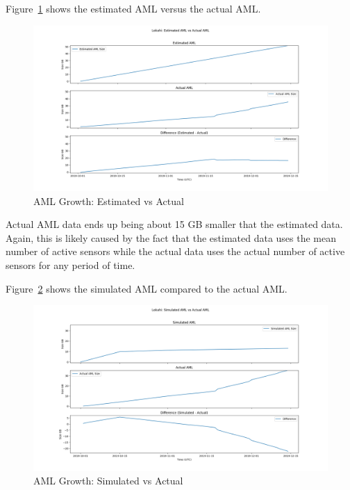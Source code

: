 Figure~\ref{fig:lokahi_actual_aml_vs_est} shows the estimated AML versus the actual AML.

\begin{figure}[H]
    \centering
    \includegraphics[width=\linewidth]{figures/lokahi_actual_aml_vs_est.png}
    \caption{AML Growth: Estimated vs Actual}
    \label{fig:lokahi_actual_aml_vs_est}
\end{figure}

Actual AML data ends up being about 15 GB smaller that the estimated data. Again, this is likely caused by the fact that the estimated data uses the mean number of active sensors while the actual data uses the actual number of active sensors for any period of time.

Figure~\ref{fig:lokahi_actual_aml_vs_sim} shows the simulated AML compared to the actual AML.

\begin{figure}[H]
    \centering
    \includegraphics[width=\linewidth]{figures/lokahi_actual_aml_vs_sim.png}
    \caption{AML Growth: Simulated vs Actual}
    \label{fig:lokahi_actual_aml_vs_sim}
\end{figure}

